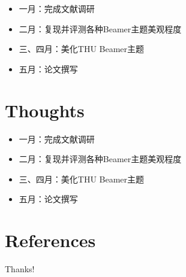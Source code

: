 \documentclass{beamer}
\begin{document}
\begin{frame}
    \begin{itemize}
        \item 一月：完成文献调研
        \item 二月：复现并评测各种Beamer主题美观程度
        \item 三、四月：美化THU Beamer主题
        \item 五月：论文撰写
    \end{itemize}
\end{frame}

\section{Thoughts}

\begin{frame}
    \begin{itemize}
        \item 一月：完成文献调研
        \item 二月：复现并评测各种Beamer主题美观程度
        \item 三、四月：美化THU Beamer主题
        \item 五月：论文撰写
    \end{itemize}
\end{frame}

\section{References}

\begin{frame}[allowframebreaks]
    \nocite{*} %
    
    
\end{frame}

\begin{frame}
    \begin{center}
        {\Huge\calligra Thanks!}
    \end{center}
\end{frame}
\end{document}
